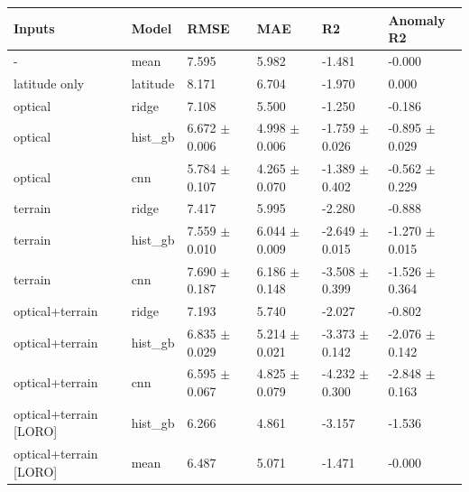\begin{tabular}{llllll}
\toprule
Inputs & Model & RMSE & MAE & R2 & Anomaly R2 \\
\midrule
- & mean & 7.595 & 5.982 & -1.481 & -0.000 \\
latitude only & latitude & 8.171 & 6.704 & -1.970 & 0.000 \\
optical & ridge & 7.108 & 5.500 & -1.250 & -0.186 \\
optical & hist\_gb & 6.672 $\pm$ 0.006 & 4.998 $\pm$ 0.006 & -1.759 $\pm$ 0.026 & -0.895 $\pm$ 0.029 \\
optical & cnn & 5.784 $\pm$ 0.107 & 4.265 $\pm$ 0.070 & -1.389 $\pm$ 0.402 & -0.562 $\pm$ 0.229 \\
terrain & ridge & 7.417 & 5.995 & -2.280 & -0.888 \\
terrain & hist\_gb & 7.559 $\pm$ 0.010 & 6.044 $\pm$ 0.009 & -2.649 $\pm$ 0.015 & -1.270 $\pm$ 0.015 \\
terrain & cnn & 7.690 $\pm$ 0.187 & 6.186 $\pm$ 0.148 & -3.508 $\pm$ 0.399 & -1.526 $\pm$ 0.364 \\
optical+terrain & ridge & 7.193 & 5.740 & -2.027 & -0.802 \\
optical+terrain & hist\_gb & 6.835 $\pm$ 0.029 & 5.214 $\pm$ 0.021 & -3.373 $\pm$ 0.142 & -2.076 $\pm$ 0.142 \\
optical+terrain & cnn & 6.595 $\pm$ 0.067 & 4.825 $\pm$ 0.079 & -4.232 $\pm$ 0.300 & -2.848 $\pm$ 0.163 \\
optical+terrain [LORO] & hist\_gb & 6.266 & 4.861 & -3.157 & -1.536 \\
optical+terrain [LORO] & mean & 6.487 & 5.071 & -1.471 & -0.000 \\
\bottomrule
\end{tabular}
